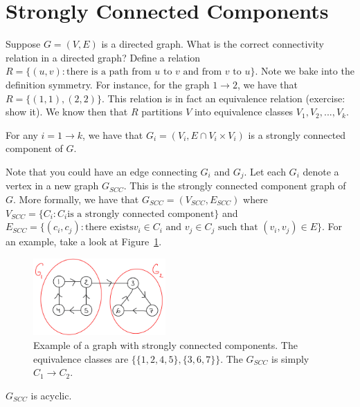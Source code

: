 
\section{Strongly Connected Components}

Suppose $G = (V, E)$ is a directed graph. What is the correct connectivity
relation in a directed graph? Define a relation $R = \{ (u, v) :
\text{there is a path from $u$ to $v$ and from $v$ to $u$} \}$. Note
we bake into the definition symmetry. For instance, for the graph
$1 \to 2$, we have that $R = \{ (1, 1), (2, 2) \}$. This relation is
in fact an equivalence relation (exercise: show it). We know then
that $R$ partitions $V$ into equivalence classes $V_1, V_2, ..., V_k$.

\begin{definition}
    For any $i = 1 \to k$, we have that 
    $G_i = (V_i, E \cap V_i \times V_i)$ is a strongly 
    connected component of $G$.
\end{definition}

Note that you
could have an edge connecting $G_i$ and $G_j$. Let each $G_i$ denote a
vertex in a new graph $G_{SCC}$. This is the
strongly connected component graph of $G$. More formally,
we have that $G_{SCC} = (V_{SCC}, E_{SCC})$ where 
$V_{SCC} = \{ C_i : C_i \text{is a strongly connected component} \}$
and $E_{SCC} = \{ (c_i, c_j) : \text{there exists
$v_i \in C_i$ and $v_j \in C_j$ such that $(v_i, v_j) \in E$} \}$. For
an example, take a look at Figure~\ref{fig:scc}.

\begin{figure}[hpt]
    \centering
    \includegraphics[width=0.45\textwidth]{figures/scc.jpeg}
    \caption{Example of a graph with strongly connected components.
    The
    equivalence classes are $\{\{1, 2, 4, 5 \},  \{3, 6, 7\}\}$. The
    $G_{SCC}$ is simply $C_1 \to C_2$.}
    \label{fig:scc}
\end{figure}

\begin{lemma}
    $G_{SCC}$ is acyclic.
\end{lemma}


